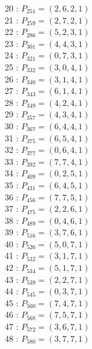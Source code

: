 \documentclass{article}
\begin{document}
{\begin{multicols}{2}
20 : $P_{251}=( 2, 6, 2, 1 )$\\
21 : $P_{259}=( 2, 7, 2, 1 )$\\
22 : $P_{286}=( 5, 2, 3, 1 )$\\
23 : $P_{301}=( 4, 4, 3, 1 )$\\
24 : $P_{321}=( 0, 7, 3, 1 )$\\
25 : $P_{332}=( 3, 0, 4, 1 )$\\
26 : $P_{340}=( 3, 1, 4, 1 )$\\
27 : $P_{343}=( 6, 1, 4, 1 )$\\
28 : $P_{349}=( 4, 2, 4, 1 )$\\
29 : $P_{357}=( 4, 3, 4, 1 )$\\
30 : $P_{367}=( 6, 4, 4, 1 )$\\
31 : $P_{375}=( 6, 5, 4, 1 )$\\
32 : $P_{377}=( 0, 6, 4, 1 )$\\
33 : $P_{392}=( 7, 7, 4, 1 )$\\
34 : $P_{409}=( 0, 2, 5, 1 )$\\
35 : $P_{431}=( 6, 4, 5, 1 )$\\
36 : $P_{456}=( 7, 7, 5, 1 )$\\
37 : $P_{475}=( 2, 2, 6, 1 )$\\
38 : $P_{489}=( 0, 4, 6, 1 )$\\
39 : $P_{516}=( 3, 7, 6, 1 )$\\
40 : $P_{526}=( 5, 0, 7, 1 )$\\
41 : $P_{532}=( 3, 1, 7, 1 )$\\
42 : $P_{534}=( 5, 1, 7, 1 )$\\
43 : $P_{539}=( 2, 2, 7, 1 )$\\
44 : $P_{545}=( 0, 3, 7, 1 )$\\
45 : $P_{560}=( 7, 4, 7, 1 )$\\
46 : $P_{568}=( 7, 5, 7, 1 )$\\
47 : $P_{572}=( 3, 6, 7, 1 )$\\
48 : $P_{580}=( 3, 7, 7, 1 )$\\
\end{multicols}
}
\end{document}
